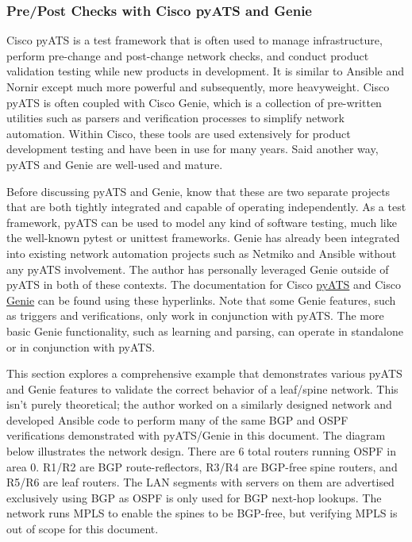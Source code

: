 \subsubsection{Pre/Post Checks with Cisco pyATS and Genie}
Cisco pyATS is a test framework that is often used to manage infrastructure,
perform pre-change and post-change network checks, and conduct product
validation testing while new products in development. It is similar to
Ansible and Nornir except much more powerful and subsequently, more
heavyweight. Cisco pyATS is often coupled with Cisco Genie, which is a
collection of pre-written utilities such as parsers and verification
processes to simplify network automation. Within Cisco, these tools are
used extensively for product development testing and have been in use
for many years. Said another way, pyATS and Genie are well-used and mature.

Before discussing pyATS and Genie, know that these are two separate projects
that are both tightly integrated and capable of operating independently. As
a test framework, pyATS can be used to model any kind of software testing, much
like the well-known pytest or unittest frameworks. Genie has already been
integrated into existing network automation projects such as Netmiko and
Ansible without any pyATS involvement. The author has personally leveraged
Genie outside of pyATS in both of these contexts. The documentation for
Cisco \href{https://developer.cisco.com/docs/pyats/}{pyATS} and Cisco
\href{https://developer.cisco.com/docs/genie-docs/}{Genie}
can be found using these hyperlinks. Note that some Genie features, such
as triggers and verifications, only work in conjunction with pyATS\@. The
more basic Genie functionality, such as learning and parsing, can
operate in standalone or in conjunction with pyATS\@.

This section explores a comprehensive example that demonstrates various pyATS
and Genie features to validate the correct behavior of a leaf/spine network.
This isn't purely theoretical; the author worked on a similarly designed
network and developed Ansible code to perform many of the same BGP and OSPF
verifications demonstrated with pyATS/Genie in this document. The diagram
below illustrates the network design. There are 6 total routers running OSPF
in area 0. R1/R2 are BGP route-reflectors, R3/R4 are BGP-free spine routers,
and R5/R6 are leaf routers. The LAN segments with servers on them are
advertised exclusively using BGP as OSPF is only used for BGP next-hop lookups.
The network runs MPLS to enable the spines to be BGP-free, but verifying MPLS
is out of scope for this document.

